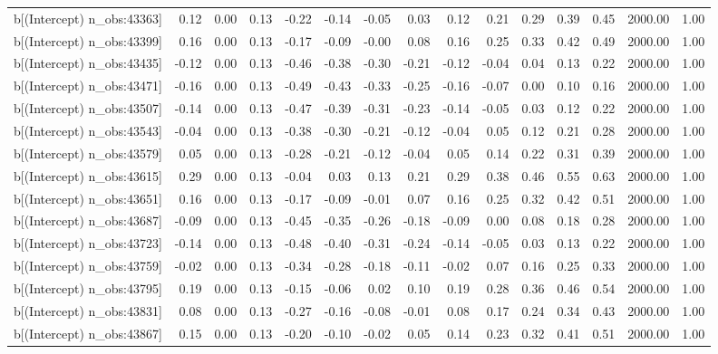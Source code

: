 \begin{table}[ht]
\begin{tabular}{rrrrrrrrrrrrrrr}
  b[(Intercept) n\_obs:43363] & 0.12 & 0.00 & 0.13 & -0.22 & -0.14 & -0.05 & 0.03 & 0.12 & 0.21 & 0.29 & 0.39 & 0.45 & 2000.00 & 1.00 \\ 
  b[(Intercept) n\_obs:43399] & 0.16 & 0.00 & 0.13 & -0.17 & -0.09 & -0.00 & 0.08 & 0.16 & 0.25 & 0.33 & 0.42 & 0.49 & 2000.00 & 1.00 \\ 
  b[(Intercept) n\_obs:43435] & -0.12 & 0.00 & 0.13 & -0.46 & -0.38 & -0.30 & -0.21 & -0.12 & -0.04 & 0.04 & 0.13 & 0.22 & 2000.00 & 1.00 \\ 
  b[(Intercept) n\_obs:43471] & -0.16 & 0.00 & 0.13 & -0.49 & -0.43 & -0.33 & -0.25 & -0.16 & -0.07 & 0.00 & 0.10 & 0.16 & 2000.00 & 1.00 \\ 
  b[(Intercept) n\_obs:43507] & -0.14 & 0.00 & 0.13 & -0.47 & -0.39 & -0.31 & -0.23 & -0.14 & -0.05 & 0.03 & 0.12 & 0.22 & 2000.00 & 1.00 \\ 
  b[(Intercept) n\_obs:43543] & -0.04 & 0.00 & 0.13 & -0.38 & -0.30 & -0.21 & -0.12 & -0.04 & 0.05 & 0.12 & 0.21 & 0.28 & 2000.00 & 1.00 \\ 
  b[(Intercept) n\_obs:43579] & 0.05 & 0.00 & 0.13 & -0.28 & -0.21 & -0.12 & -0.04 & 0.05 & 0.14 & 0.22 & 0.31 & 0.39 & 2000.00 & 1.00 \\ 
  b[(Intercept) n\_obs:43615] & 0.29 & 0.00 & 0.13 & -0.04 & 0.03 & 0.13 & 0.21 & 0.29 & 0.38 & 0.46 & 0.55 & 0.63 & 2000.00 & 1.00 \\ 
  b[(Intercept) n\_obs:43651] & 0.16 & 0.00 & 0.13 & -0.17 & -0.09 & -0.01 & 0.07 & 0.16 & 0.25 & 0.32 & 0.42 & 0.51 & 2000.00 & 1.00 \\ 
  b[(Intercept) n\_obs:43687] & -0.09 & 0.00 & 0.13 & -0.45 & -0.35 & -0.26 & -0.18 & -0.09 & 0.00 & 0.08 & 0.18 & 0.28 & 2000.00 & 1.00 \\ 
  b[(Intercept) n\_obs:43723] & -0.14 & 0.00 & 0.13 & -0.48 & -0.40 & -0.31 & -0.24 & -0.14 & -0.05 & 0.03 & 0.13 & 0.22 & 2000.00 & 1.00 \\ 
  b[(Intercept) n\_obs:43759] & -0.02 & 0.00 & 0.13 & -0.34 & -0.28 & -0.18 & -0.11 & -0.02 & 0.07 & 0.16 & 0.25 & 0.33 & 2000.00 & 1.00 \\ 
  b[(Intercept) n\_obs:43795] & 0.19 & 0.00 & 0.13 & -0.15 & -0.06 & 0.02 & 0.10 & 0.19 & 0.28 & 0.36 & 0.46 & 0.54 & 2000.00 & 1.00 \\ 
  b[(Intercept) n\_obs:43831] & 0.08 & 0.00 & 0.13 & -0.27 & -0.16 & -0.08 & -0.01 & 0.08 & 0.17 & 0.24 & 0.34 & 0.43 & 2000.00 & 1.00 \\ 
  b[(Intercept) n\_obs:43867] & 0.15 & 0.00 & 0.13 & -0.20 & -0.10 & -0.02 & 0.05 & 0.14 & 0.23 & 0.32 & 0.41 & 0.51 & 2000.00 & 1.00 \\ 

\end{tabular}
\end{table}
